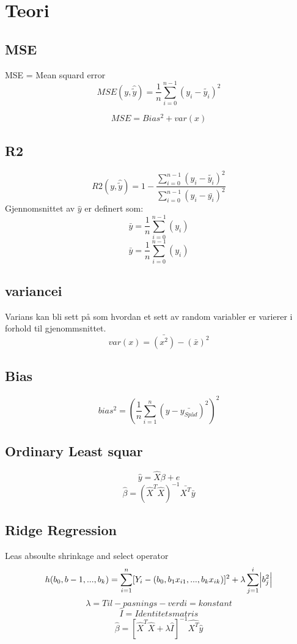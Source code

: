 \documentclass[norsk,a4paper,12pt]{article}
\begin{document}
\section*{Teori}
\subsection*{MSE}
MSE = Mean squard error
\[ MSE(y,\hat{\widetilde{ y}}) =\frac{1}{n}\sum^{n-1}_{i=0}(y_i -\widetilde{ y_i})^2\]


\[ MSE = Bias^2 + var(x)\]
\subsection*{R2}

\[ R2(y,\hat{\widetilde{ y}}) =1-\frac{\sum^{n-1}_{i=0}(y_i -\widetilde{ y_i})^2}{\sum^{n-1}_{i=0}(y_i - \bar{y_i})^2} \]
Gjennomsnittet av $\hat{y}$ er definert som:\[\bar{y} =\frac{1}{n}\sum^{n-1}_{i=0}(y_i)\]
\[\bar{y} =\frac{1}{n}\sum^{n-1}_{i=0}(y_i)\]

\subsection*{variancei}
Varians kan bli sett på som  hvordan et sett av random variabler er varierer i forhold til gjenommsnittet.
\[var(x)= \bar{(x^{2})}-(\bar{x})^{2}\]

\subsection*{Bias}





\[bias^{2} =(\frac{1}{n}\sum_{i=1}^{n}{(y-\bar{y_{Spåd}})^{2}})^2\]



\subsection*{ Ordinary Least squar}
		\[\hat{y} = \hat{X}\beta+ e\]
		\[\hat{\beta} =(\hat{X}^{T}\hat{X})^{-1}\bar{X^T}\bar{y}\]


\subsection*{ Ridge Regression}
Leas absoulte shrinkage and select operator
	\[h(b_0,b-1,...,b_k)=\sum^{n}_{i=1}[Y_i -(b_0,b_{1}x_{i1},...,b_{k}x_{ik})]^2 + \lambda \sum_{j=1}^{i}\abs{b_{j}^2}\]
	\[\lambda=Til-pasnings-verdi= konstant\]
	\[\hat{I}=Identitets matris \]
	\[\hat{\beta} =[\hat{X}^{T}\hat{X}+ \lambda \hat{I}]^{-1}\hat{X^T}\hat{y}\]
\end{document}
